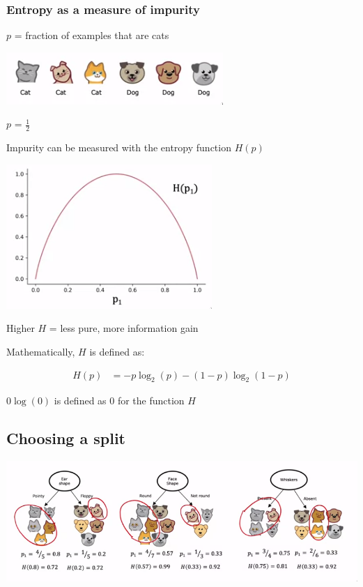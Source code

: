 \documentclass[12pt]{article}
\begin{document}
\subsubsection{Entropy as a measure of impurity}

$p$ = fraction of examples that are cats

\includegraphics{purity}

$p$ = $\frac{1}{2}$

Impurity can be measured with the entropy function $H(p)$

\includegraphics{entropy}

Higher $H$ = less pure, more information gain

Mathematically, $H$ is defined as:

\begin{align*}
    H(p) &= -p \log_2(p) - (1 - p) \log_2(1 - p)
\end{align*}

$0 \log(0)$ is defined as 0 for the function $H$

\subsection{Choosing a split}

\includegraphics[scale=.6]{split}
\end{document}
